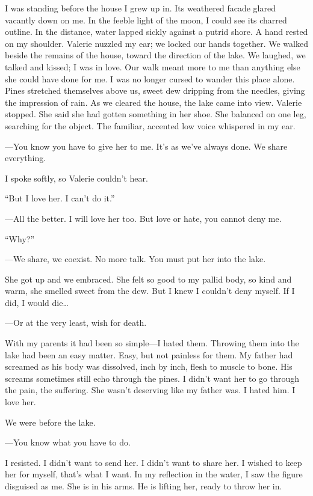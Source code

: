 I was standing before the house I grew up in. Its weathered facade
glared vacantly down on me. In the feeble light of the moon, I could see
its charred outline. In the distance, water lapped sickly against a
putrid shore. A hand rested on my shoulder. Valerie nuzzled my ear; we
locked our hands together. We walked beside the remains of the house,
toward the direction of the lake. We laughed, we talked and kissed; I
was in love. Our walk meant more to me than anything else she could have
done for me. I was no longer cursed to wander this place alone. Pines
stretched themselves above us, sweet dew dripping from the needles,
giving the impression of rain. As we cleared the house, the lake came
into view. Valerie stopped. She said she had gotten something in her
shoe. She balanced on one leg, searching for the object. The familiar,
accented low voice whispered in my ear.

---You know you have to give her to me. It's as we've always done. We
share everything.

I spoke softly, so Valerie couldn't hear.

``But I love her. I can't do it.''

---All the better. I will love her too. But love or hate, you cannot
deny me.

``Why?''

---We share, we coexist. No more talk. You must put her into the lake.

She got up and we embraced. She felt so good to my pallid body, so kind
and warm, she smelled sweet from the dew. But I knew I couldn't deny
myself. If I did, I would die\ldots{}

---Or at the very least, wish for death.

With my parents it had been so simple---I hated them. Throwing them into
the lake had been an easy matter. Easy, but not painless for them. My
father had screamed as his body was dissolved, inch by inch, flesh to
muscle to bone. His screams sometimes still echo through the pines. I
didn't want her to go through the pain, the suffering. She wasn't
deserving like my father was. I hated him. I love her.

We were before the lake.

---You know what you have to do.

I resisted. I didn't want to send her. I didn't want to share her. I
wished to keep her for myself, that's what I want. In my reflection in
the water, I saw the figure disguised as me. She is in his arms. He is
lifting her, ready to throw her in.

